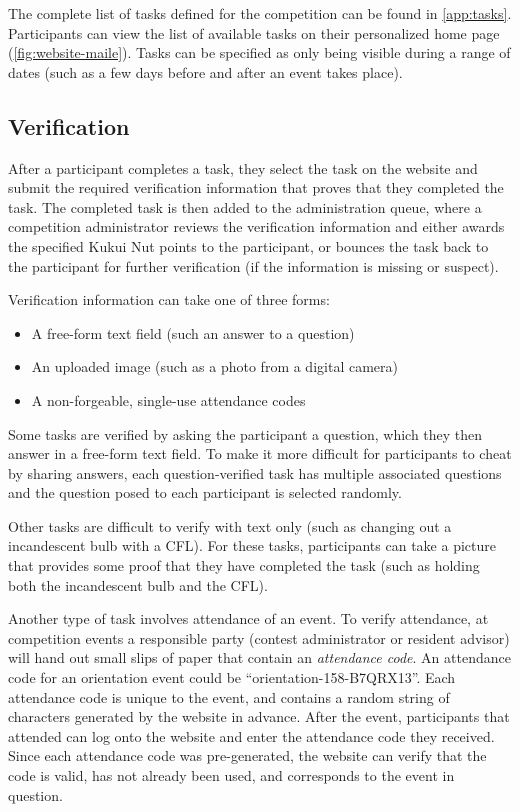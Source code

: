 The complete list of tasks defined for the competition can be found in \autoref{app:tasks}. Participants can view the list of available tasks on their personalized home page (\autoref{fig:website-maile}). Tasks can be specified as only being visible during a range of dates (such as a few days before and after an event takes place).

\subsection{Verification}
\label{sec:task-verification}

After a participant completes a task, they select the task on the website and submit the required verification information that proves that they completed the task. The completed task is then added to the administration queue, where a competition administrator reviews the verification information and either awards the specified Kukui Nut points to the participant, or bounces the task back to the participant for further verification (if the information is missing or suspect).

Verification information can take one of three forms:

\begin{itemize}
	\item A free-form text field (such an answer to a question)
	\item An uploaded image (such as a photo from a digital camera)
	\item A non-forgeable, single-use attendance codes
\end{itemize}

Some tasks are verified by asking the participant a question, which they then answer in a free-form text field. To make it more difficult for participants to cheat by sharing answers, each question-verified task has multiple associated questions and the question posed to each participant is selected randomly.

Other tasks are difficult to verify with text only (such as changing out a incandescent bulb with a CFL). For these tasks, participants can take a picture that provides some proof that they have completed the task (such as holding both the incandescent bulb and the CFL).

Another type of task involves attendance of an event. To verify attendance, at competition events a responsible party (contest administrator or resident advisor) will hand out small slips of paper that contain an \emph{attendance code}. An attendance code for an orientation event could be ``orientation-158-B7QRX13''. Each attendance code is unique to the event, and contains a random string of characters generated by the website in advance. After the event, participants that attended can log onto the website and enter the attendance code they received. Since each attendance code was pre-generated, the website can verify that the code is valid, has not already been used, and corresponds to the event in question.

